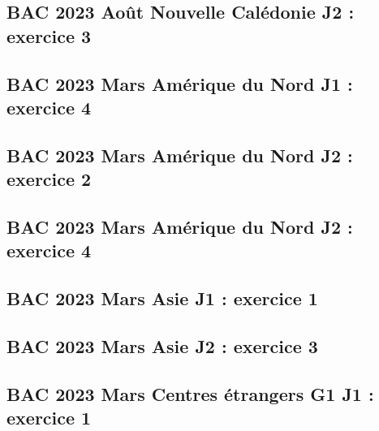 \documentclass[lang=fr,edition=teacher,layout=sheet]{mxbook}
\begin{document}
\begingroup\endgroup
\par\bigskip
{}\subsection*{BAC 2023 Août Nouvelle Calédonie J2 : exercice 3}
\begingroup\endgroup
\par\bigskip
{}\subsection*{BAC 2023 Mars Amérique du Nord J1 : exercice 4}
\begingroup\endgroup
\par\bigskip
{}\subsection*{BAC 2023 Mars Amérique du Nord J2 : exercice 2}
\begingroup\endgroup
\par\bigskip
{}\subsection*{BAC 2023 Mars Amérique du Nord J2 : exercice 4}
\begingroup\endgroup
\par\bigskip
{}\subsection*{BAC 2023 Mars Asie J1 : exercice 1}
\begingroup\endgroup
\par\bigskip
{}\subsection*{BAC 2023 Mars Asie J2 : exercice 3}
\begingroup\endgroup
\par\bigskip
{}\subsection*{BAC 2023 Mars Centres étrangers G1 J1 : exercice 1}
\end{document}
